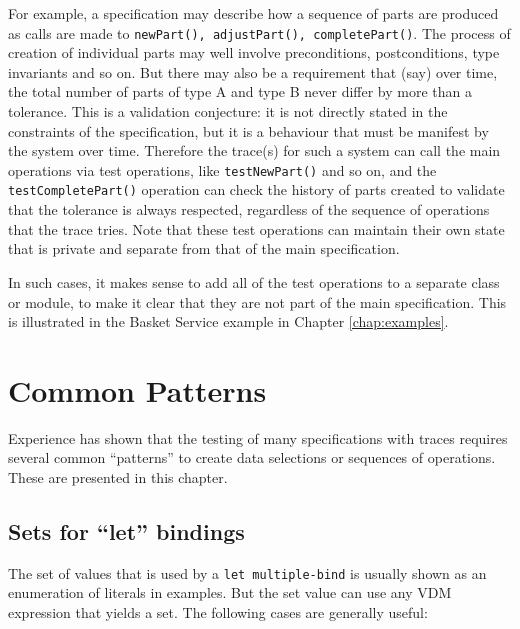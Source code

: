 \documentclass{overturerepchap}
\begin{document}
For example, a specification may describe how a sequence of parts are produced
as calls are made to \texttt{newPart(), adjustPart(), completePart()}. The
process of creation of individual parts may well involve preconditions,
postconditions, type invariants and so on. But there may also be a requirement
that (say) over time, the total number of parts of type A and type B never
differ by more than a tolerance. This is a validation conjecture: it is not
directly stated in the constraints of the specification, but it is a behaviour
that must be manifest by the system over time. Therefore the trace(s) for such
a system can call the main operations via test operations, like
\texttt{testNewPart()} and so on, and the \texttt{testCompletePart()} operation
can check the history of parts created to validate that the tolerance is always
respected, regardless of the sequence of operations that the trace tries. Note
that these test operations can maintain their own state that is private and
separate from that of the main specification.

In such cases, it makes sense to add all of the test operations to a separate
class or module, to make it clear that they are not part of the main
specification. This is illustrated in the Basket Service example in Chapter
\ref{chap:examples}.

\section{Common Patterns}

Experience has shown that the testing of many specifications with traces
requires several common ``patterns'' to create data selections or sequences of
operations. These are presented in this chapter.

\subsection{Sets for ``let'' bindings}

The set of values that is used by a \texttt{let multiple-bind} is usually
shown as an enumeration of literals in examples. But the set value can use any
VDM expression that yields a set. The following cases are generally useful:
\end{document}
